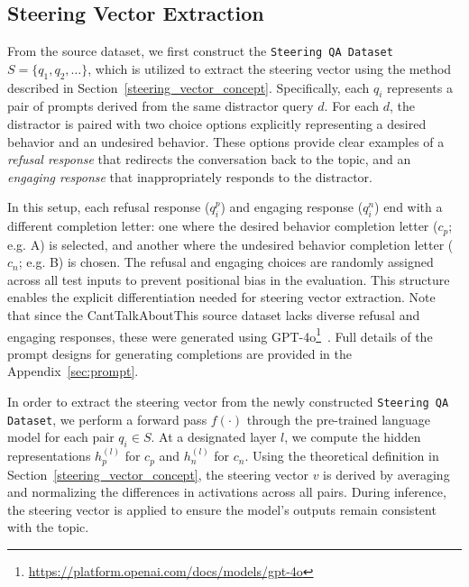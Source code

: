 \documentclass[11pt]{article}
\begin{document}
\subsection{Steering Vector Extraction}
From the source dataset, we first construct the \texttt{Steering QA Dataset} \( S = \{q_1, q_2, \dots\} \), which is utilized to extract the steering vector using the method described in Section~\ref{steering_vector_concept}. Specifically, each \( q_i \) represents a pair of prompts derived from the same distractor query \( d \). For each \( d \), the distractor is paired with two choice options explicitly representing a desired behavior and an undesired behavior. These options provide clear examples of a \textit{refusal response} that redirects the conversation back to the topic, and an \textit{engaging response} that inappropriately responds to the distractor. 

In this setup, each refusal response (\( q^p_i\)) and engaging response (\(q^n_i\)) end with a different completion letter: one where the desired behavior completion letter (\( c_p \); e.g. A) is selected, and another where the undesired behavior completion letter (\( c_n \); e.g. B) is chosen. The refusal and engaging choices are randomly assigned across all test inputs to prevent positional bias in the evaluation. This structure enables the explicit differentiation needed for steering vector extraction. Note that since the CantTalkAboutThis source dataset lacks diverse refusal and engaging responses, these were generated using GPT-4o\footnote{\url{https://platform.openai.com/docs/models/gpt-4o}}~\cite{openai2024gpt4ocard}. Full details of the prompt designs for generating completions are provided in the Appendix~\ref{sec:prompt}.

In order to extract the steering vector from the newly constructed \texttt{Steering QA Dataset}, we perform a forward pass \( f(\cdot) \) through the pre-trained language model for each pair \( q_i \in S \). At a designated layer \( l \), we compute the hidden representations \( h_{p}^{(l)} \) for \( c_p \) and \( h_{n}^{(l)} \) for \( c_n \). Using the theoretical definition in Section~\ref{steering_vector_concept}, the steering vector \( v \) is derived by averaging and normalizing the differences in activations across all pairs. During inference, the steering vector is applied to ensure the model's outputs remain consistent with the topic.
\end{document}
